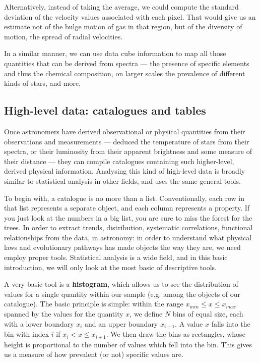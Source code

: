 \documentclass[twocolumn,apj]{openjournal}
\begin{document}
Alternatively, instead of taking the average, we could compute the standard deviation of the velocity values associated with each pixel. That would give us an estimate not of the bulge motion of gas in that region, but of the diversity of motion, the spread of radial velocities.

In a similar manner, we can use data cube information to map all those quantities that can be derived from spectra --- the presence of specific elements and thus the chemical composition, on larger scales the prevalence of different kinds of stars, and more.

\subsection{High-level data: catalogues and tables}
\label{HighLevel}

Once astronomers have derived observational or physical quantities from their observations and measurements --- deduced the temperature of stars from their spectra, or their luminosity from their apparent brightness and some measure of their distance --- they can compile catalogues containing such higher-level, derived physical information. Analysing this kind of high-level data is broadly similar to statistical analysis in other fields, and uses the same general tools.

To begin with, a catalogue is no more than a list. Conventionally, each row in that list represents a separate object, and each column represents a property. If you just look at the numbers in a big list, you are sure to miss the forest for the trees. In order to extract trends, distribution, systematic correlations, functional relationships from the data, in astronomy: in order to understand what physical laws and evolutionary pathways has made objects the way they are, we need employ proper tools. Statistical analysis is a wide field, and in this basic introduction, we will only look at the most basic of descriptive tools. 

A very basic tool is a {\bf histogram}, which allows us to see the distribution of values for a single quantity within our sample (e.g. among the objects of our catalogue). The basic principle is simple: within the range $x_{min} \le x\le x_{max}$ spanned by the values for the quantity $x$, we define $N$ bins of equal size, each with a lower boundary $x_i$ and an upper boundary $x_{i+1}$. A value $x$ falls into the bin with index $i$ if
$x_i< x\le x_{i+1}$. We then draw the bins as rectangles, whose height is proportional to the number of values which fell into the bin. This gives us a measure of how prevalent (or not) specific values are.
\end{document}
